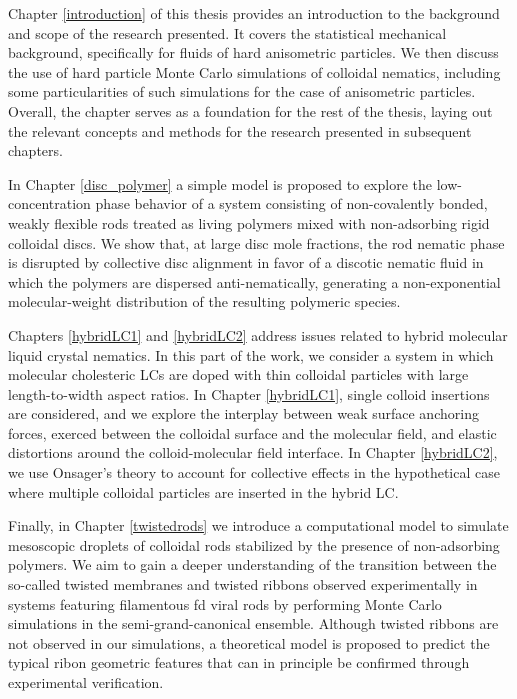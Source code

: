 Chapter \ref{introduction} of this thesis provides an introduction to the background and scope of the research presented. It covers the statistical mechanical background, specifically for fluids of hard anisometric particles. We then discuss the use of hard particle Monte Carlo simulations of colloidal nematics, including some particularities of such simulations for the case of anisometric particles. Overall, the chapter serves as a foundation for the rest of the thesis, laying out the relevant concepts and methods for the research presented in subsequent chapters.

In Chapter \ref{disc_polymer} a simple model is proposed to explore the low-concentration phase behavior of a system consisting of non-covalently bonded, weakly flexible rods treated as living polymers mixed with non-adsorbing rigid colloidal discs. We show that, at large disc mole fractions, the rod nematic phase is disrupted by collective disc alignment in favor of a discotic nematic fluid in which the polymers are dispersed anti-nematically, generating a non-exponential molecular-weight distribution of the resulting polymeric species.

Chapters \ref{hybridLC1} and \ref{hybridLC2} address issues related to hybrid molecular liquid crystal nematics. In this part of the work, we consider a system in which molecular cholesteric LCs are doped with thin colloidal particles with large length-to-width aspect ratios. In Chapter \ref{hybridLC1}, single colloid insertions are considered, and we explore the interplay between weak surface anchoring forces, exerced between the colloidal surface and the molecular field, and elastic distortions around the colloid-molecular field interface. In Chapter \ref{hybridLC2}, we use Onsager's theory to account for collective effects in the hypothetical case where multiple colloidal particles are inserted in the hybrid LC.

Finally, in Chapter  \ref{twistedrods} we introduce a computational model to simulate mesoscopic droplets of colloidal rods stabilized by the presence of non-adsorbing polymers. We aim to gain a deeper understanding of the transition between the so-called twisted membranes and twisted ribbons observed experimentally in systems featuring filamentous fd viral rods \cite{Gibaud2012} by performing Monte Carlo simulations in the semi-grand-canonical ensemble. Although twisted ribbons are not observed in our simulations, a theoretical model is proposed to predict the typical ribon geometric features that can in principle be confirmed through experimental verification.


